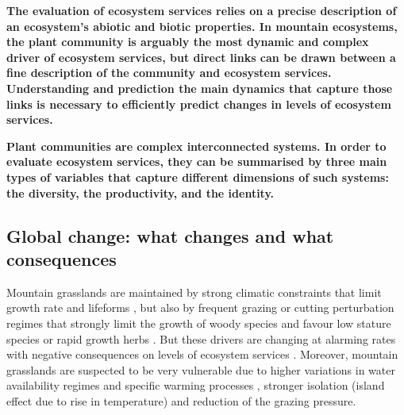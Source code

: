 
%




\textbf{The evaluation of ecosystem services relies on a precise description of an ecosystem's abiotic and biotic properties. In mountain ecosystems, the plant community is arguably the most dynamic and complex driver of ecosystem services, but direct links can be drawn between a fine description of the community and ecosystem services. Understanding and prediction the main dynamics that capture those links is necessary to efficiently predict changes in levels of ecosystem services.}

\textbf{Plant communities are complex interconnected systems. In order to evaluate ecosystem services, they can be summarised by three main types of variables that capture different dimensions of such systems: the diversity, the productivity, and the identity. %
}



\subsection{Global change: what changes and what consequences}

Mountain grasslands are maintained by strong climatic constraints that limit growth rate and lifeforms  \parencite{korner_alpine_2003}, but also by frequent grazing or cutting perturbation regimes that strongly limit the growth of woody species and favour low stature species or rapid growth herbs \parencite{diaz_plant_2007}. But these drivers are changing at alarming rates with negative consequences on levels of ecosystem services \parencite{schroter_ecosystem_2005}. Moreover, mountain grasslands are suspected to be very vulnerable \parencite{schroter_ecosystem_2005, engler_21st_2011} due to higher variations in water availability regimes and specific warming processes \parencite{mountain_research_initiative_edw_working_group_elevation-dependent_2015}, stronger isolation (island effect due to rise in temperature) and reduction of the grazing pressure.

